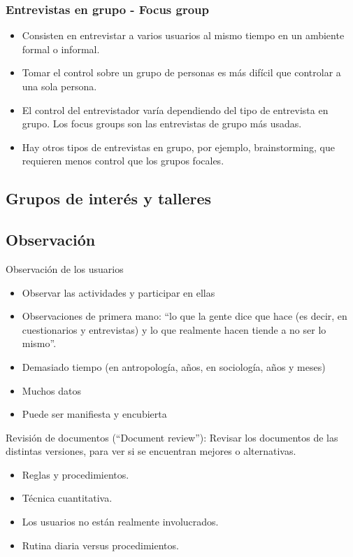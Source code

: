 \documentclass[12pt, twoside, openright]{report} %
\begin{document}
\subsubsection{Entrevistas en grupo - Focus group}

\begin{itemize}
	\item Consisten en entrevistar a varios usuarios al mismo tiempo en
	      un ambiente formal o informal.
	\item Tomar el control sobre un grupo de personas es más difícil que
	      controlar a una sola persona.
	\item El control del entrevistador varía dependiendo del tipo de
	      entrevista en grupo. Los focus groups son las entrevistas de
	      grupo más usadas.
	\item Hay otros tipos de entrevistas en grupo, por ejemplo,
	      brainstorming, que requieren menos control que los grupos
	      focales.
\end{itemize}
\subsection{Grupos de interés y talleres}
\subsection{Observación}

Observación de los usuarios

\begin{itemize}
	\item Observar las actividades y participar en ellas
	\item Observaciones de primera mano: \enquote{lo que la gente dice que hace
	      (es decir, en cuestionarios y entrevistas) y lo que realmente
	      hacen tiende a no ser lo mismo}.
	\item Demasiado tiempo (en antropología, años, en sociología, años y
	      meses)
	\item Muchos datos
	\item Puede ser manifiesta y encubierta
\end{itemize}

Revisión de documentos (\enquote{Document review}): Revisar los
documentos de las distintas versiones, para ver si se encuentran
mejores o alternativas.

\begin{itemize}
	\item Reglas y procedimientos.
	\item Técnica cuantitativa.
	\item Los usuarios no están realmente involucrados.
	\item Rutina diaria versus procedimientos.
\end{itemize}
\end{document}
